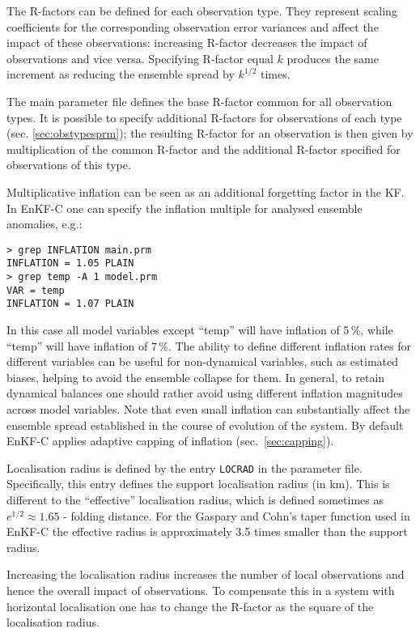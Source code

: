\documentclass[11pt]{report}
\begin{document}
The R-factors can be defined for each observation type.
They represent scaling coefficients for the corresponding observation error variances and affect the impact of these observations: increasing R-factor decreases the impact of observations and vice versa.
Specifying R-factor equal $k$ produces the same increment as reducing the ensemble spread by $k^{1/2}$ times.

The main parameter file defines the base R-factor common for all observation types.
It is possible to specify additional R-factors for observations of each type (sec. \ref{sec:obstypesprm}); the resulting R-factor for an observation is then given by multiplication of the common R-factor and the additional R-factor specified for observations of this type.

Multiplicative inflation can be seen as an additional forgetting factor in the KF.
In EnKF-C one can specify the inflation multiple for analysed ensemble anomalies, e.g.:
\begin{Verbatim}[frame=single,fontsize=\footnotesize]
> grep INFLATION main.prm
INFLATION = 1.05 PLAIN
> grep temp -A 1 model.prm
VAR = temp
INFLATION = 1.07 PLAIN
\end{Verbatim}
In this case all model variables except ``temp'' will have inflation of 5\,\%, while ``temp'' will have inflation of 7\,\%.
The ability to define different inflation rates for different variables can be useful for non-dynamical variables, such as estimated biases, helping to avoid the ensemble collapse for them.
In general, to retain dynamical balances one should rather avoid using different inflation magnitudes across model variables.
Note that even small inflation can substantially affect the ensemble spread established in the course of evolution of the system.
By default EnKF-C applies adaptive capping of inflation (sec.~\ref{sec:capping}).

Localisation radius is defined by the entry \verb|LOCRAD| in the parameter file.
Specifically, this entry defines the support localisation radius (in km).
This is different to the ``effective'' localisation radius, which is defined sometimes as $e^{1/2}\approx 1.65$ - folding distance.
For the Gaspary and Cohn's taper function used in EnKF-C the effective radius is approximately 3.5 times smaller than the support radius.

Increasing the localisation radius increases the number of local observations and hence the overall impact of observations.
To compensate this in a system with horizontal localisation one has to change the R-factor as the square of the localisation radius.
\end{document}
